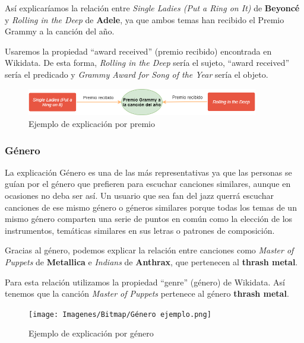Así explicaríamos la relación entre \textit{Single Ladies (Put a Ring on It)} de \textbf{Beyoncé} y \textit{Rolling in the Deep} de \textbf{Adele}, ya que ambos temas han recibido el Premio Grammy a la canción del año.

Usaremos la propiedad ``award received'' (premio recibido) encontrada en Wikidata. De esta forma, \textit{Rolling in the Deep} sería el sujeto, ``award received'' sería el predicado y \textit{Grammy Award for Song of the Year} sería el objeto.\\

\begin{figure}[h!]
	\centering
	\includegraphics[width = 0.9\textwidth]{Imagenes/Bitmap/Premio ejemplo.png}
	\caption{Ejemplo de explicación por premio}
	\label{fig:sampleImage}
\end{figure}

\subsubsection*{Género}

La explicación Género es una de las más representativas ya que las personas se guían por el género que prefieren para escuchar canciones similares, aunque en ocasiones no deba ser así. Un usuario que sea fan del jazz querrá escuchar canciones de ese mismo género o géneros similares porque todas los temas de un mismo género comparten una serie de puntos en común como la elección de los instrumentos, temáticas similares en sus letras o patrones de composición.

Gracias al género, podemos explicar la relación entre canciones como \textit{Master of Puppets} de \textbf{Metallica} e \textit{Indians} de \textbf{Anthrax}, que pertenecen al \textbf{thrash metal}.

Para esta relación utilizamos la propiedad ``genre'' (género) de Wikidata. Así tenemos que la canción \textit{Master of Puppets} pertenece al género \textbf{thrash metal}.\\

\begin{figure}[h!]
	\centering
	\texttt{[image: Imagenes/Bitmap/Género ejemplo.png]}
	\caption{Ejemplo de explicación por género}
	\label{fig:sampleImage}
\end{figure}

